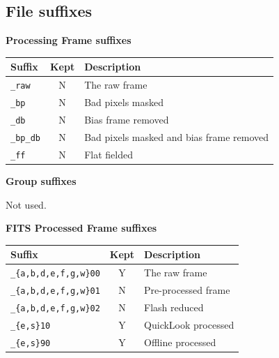 \documentclass[twoside,11pt,nolof]{starlink}
\begin{document}
\subsection{File suffixes}

\textbf{Processing Frame suffixes}

\vspace{0.2cm}

\begin{tabular}{l c l}
\hline
Suffix & Kept & Description \hspace{9cm}  \\
\hline
\texttt{\_raw} & N & The raw frame\\
\texttt{\_bp}  & N & Bad pixels masked\\
\texttt{\_db}  & N & Bias frame removed\\
\texttt{\_bp\_db}  & N & Bad pixels masked and bias frame removed\\
\texttt{\_ff}  & N & Flat fielded\\
\hline
\end{tabular}

\vspace{0.5cm}

\textbf{Group suffixes}

\vspace{0.2cm}

Not used.

\vspace{0.5cm}

\textbf{FITS Processed Frame suffixes}

\vspace{0.2cm}

\begin{tabular}{l c l}
\hline
Suffix & Kept & Description \hspace{9cm}  \\
\hline
\texttt{\_\{a,b,d,e,f,g,w\}00} & Y & The raw frame\\
\texttt{\_\{a,b,d,e,f,g,w\}01}  & N & Pre-processed frame\\
\texttt{\_\{a,b,d,e,f,g,w\}02}  & N & Flash reduced\\
\texttt{\_\{e,s\}10}  & Y & QuickLook processed\\
\texttt{\_\{e,s\}90}  & Y & Offline processed\\
\hline
\end{tabular}
\end{document}
